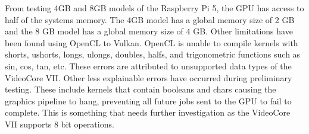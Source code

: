 \documentclass[conference]{IEEEtran}
\begin{document}
 From testing 4GB and 8GB models of the Raspberry Pi 5, the GPU has access to half of the systems memory. 
 The 4GB model has a global memory size of 2 GB and the 8 GB model has a global memory size of 4 GB. Other limitations 
 have been found using OpenCL to Vulkan. OpenCL is unable to compile kernels with shorts, ushorts, longs, ulongs, doubles,
 halfs, and trigonometric functions such as sin, cos, tan, etc. These errors are attributed to unsupported data 
 types of the VideoCore VII. Other less explainable errors have occurred during preliminary testing. These include
 kernels that contain booleans and chars causing the graphics pipeline to hang, preventing all future jobs sent to 
 the GPU to fail to complete. This is something that needs further investigation as the VideoCore VII supports 8 bit 
 operations. 
\end{document}
